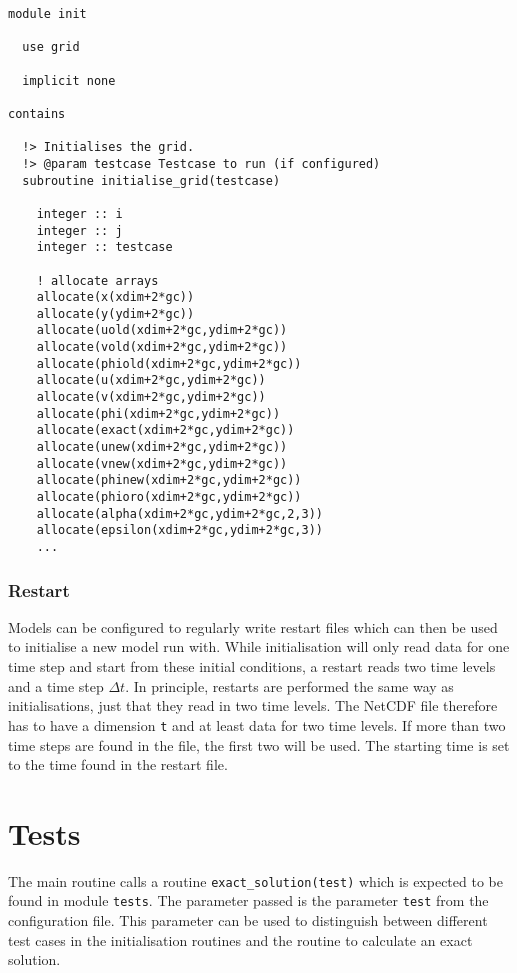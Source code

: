 \documentclass[11pt,a4paper,openright,twoside]{book}
\begin{document}
\begin{verbatim}
module init

  use grid

  implicit none

contains

  !> Initialises the grid.
  !> @param testcase Testcase to run (if configured)
  subroutine initialise_grid(testcase)

    integer :: i
    integer :: j
    integer :: testcase

    ! allocate arrays
    allocate(x(xdim+2*gc))
    allocate(y(ydim+2*gc))
    allocate(uold(xdim+2*gc,ydim+2*gc))
    allocate(vold(xdim+2*gc,ydim+2*gc))
    allocate(phiold(xdim+2*gc,ydim+2*gc))
    allocate(u(xdim+2*gc,ydim+2*gc))
    allocate(v(xdim+2*gc,ydim+2*gc))
    allocate(phi(xdim+2*gc,ydim+2*gc))
    allocate(exact(xdim+2*gc,ydim+2*gc))
    allocate(unew(xdim+2*gc,ydim+2*gc))
    allocate(vnew(xdim+2*gc,ydim+2*gc))
    allocate(phinew(xdim+2*gc,ydim+2*gc))
    allocate(phioro(xdim+2*gc,ydim+2*gc))
    allocate(alpha(xdim+2*gc,ydim+2*gc,2,3))
    allocate(epsilon(xdim+2*gc,ydim+2*gc,3))
    ...
\end{verbatim}

\subsubsection{Restart}
Models can be configured to regularly write restart files which can then be used to initialise a new model run with. While
initialisation will only read data for one time step and start from these initial conditions, a restart reads two time levels
and a time step $\Delta t$. In principle, restarts are performed the same way as initialisations, just that they read in two
time levels. The NetCDF file therefore has to have a dimension \texttt{t} and at least data for two time levels. If more than
two time steps are found in the file, the first two will be used. The starting time is set to the time found in the restart
file.

\section{Tests}
\label{test-routines}
The main routine calls a routine \texttt{exact\_solution(test)} which is expected to be found in module \texttt{tests}. The
parameter passed is the parameter \texttt{test} from the configuration file. This parameter can be used to distinguish
between different test cases in the initialisation routines and the routine to calculate an exact solution.
\end{document}
